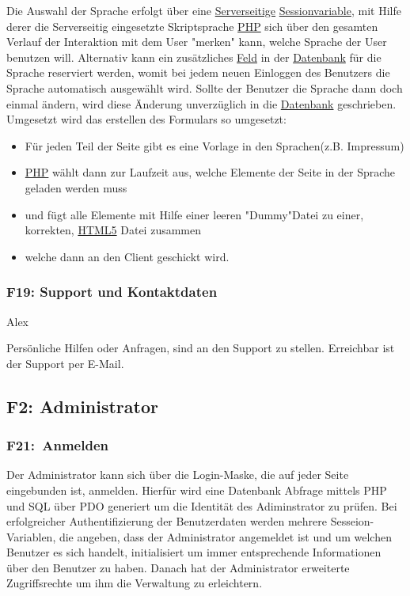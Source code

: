 \documentclass[10pt,a4paper]{scrartcl}
\begin{document}
Die Auswahl der Sprache erfolgt über eine \underline{Serverseitige} \underline{Sessionvariable}, mit Hilfe derer 
die Serverseitig eingesetzte Skriptsprache \underline{PHP} sich über den gesamten Verlauf der Interaktion mit dem User "merken" kann,
welche Sprache der User benutzen will. Alternativ kann ein zusätzliches \underline{Feld} in der \underline{Datenbank} für die 
Sprache reserviert werden, womit bei jedem neuen Einloggen des Benutzers die Sprache automatisch ausgewählt wird. Sollte der Benutzer
die Sprache dann doch einmal ändern, wird diese Änderung unverzüglich in die \underline{Datenbank} geschrieben.
Umgesetzt wird das erstellen des Formulars so umgesetzt:
\begin{itemize}
 \item Für jeden Teil der Seite gibt es eine Vorlage in den Sprachen(z.B. Impressum)
 \item \underline{PHP} wählt dann zur Laufzeit aus, welche Elemente der Seite in der Sprache geladen werden muss
 \item und fügt alle Elemente mit Hilfe einer leeren "Dummy"Datei zu einer, korrekten, \underline{HTML5} Datei zusammen
 \item welche dann an den Client geschickt wird.
\end{itemize}

\subsubsection*{F19: Support und Kontaktdaten}

Alex

Persönliche Hilfen oder Anfragen, sind an den Support zu stellen. Erreichbar ist der Support per E-Mail. 


\subsection{F2: Administrator}
\subsubsection*{F21: Anmelden}

Der Administrator kann sich über die Login-Maske, die auf jeder Seite eingebunden ist, anmelden. Hierfür wird eine Datenbank Abfrage mittels PHP und SQL über PDO generiert um die Identität des Adiminstrator zu prüfen. Bei erfolgreicher Authentifizierung der Benutzerdaten werden mehrere Sesseion-Variablen, die angeben, dass der Administrator angemeldet ist und um welchen Benutzer es sich handelt, initialisiert um immer entsprechende Informationen über den Benutzer zu haben. Danach hat der Administrator erweiterte Zugriffsrechte um ihm die Verwaltung zu erleichtern.
\end{document}
